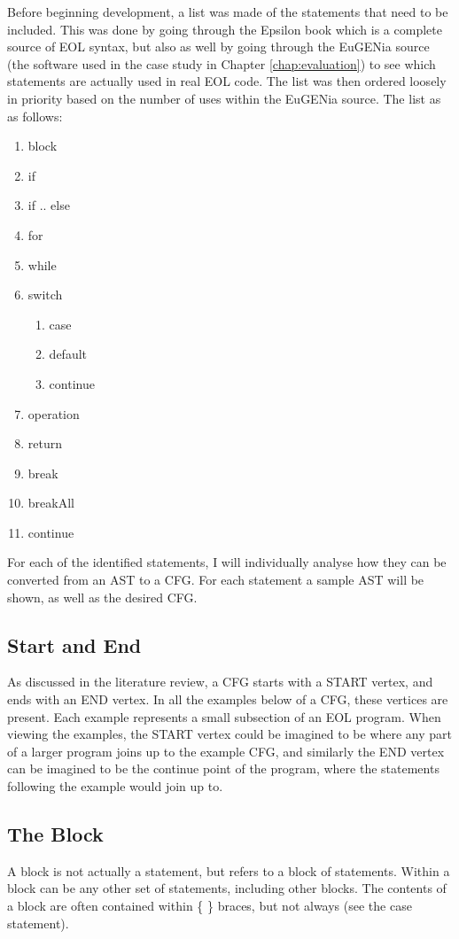 Before beginning development, a list was made of the statements that need to be included. This was done by going through the Epsilon book \citep{epsilonBook} which is a complete source of EOL syntax, but also as well by going through the EuGENia source (the software used in the case study in Chapter \ref{chap:evaluation}) to see which statements are actually used in real EOL code. The list was then ordered loosely in priority based on the number of uses within the EuGENia source. The list as as follows:

\begin{enumerate}[nolistsep]
\item block
\item if
\item if .. else
\item for
\item while
\item switch
	\begin{enumerate}
	\item case
	\item default
	\item continue
	\end{enumerate}
\item operation
\item return
\item break
\item breakAll
\item continue
\end{enumerate}

For each of the identified statements, I will individually analyse how they can be converted from an AST to a CFG. For each statement a sample AST will be shown, as well as the desired CFG.

\subsection{Start and End}
As discussed in the literature review, a CFG starts with a START vertex, and ends with an END vertex. In all the examples below of a CFG, these vertices are present. Each example represents a small subsection of an EOL program. When viewing the examples, the START vertex could be imagined to be where any part of a larger program joins up to the example CFG, and similarly the END vertex can be imagined to be the continue point of the program, where the statements following the example would join up to.

\subsection{The Block}
A block is not actually a statement, but refers to a block of statements. Within a block can be any other set of statements, including other blocks. The contents of a block are often contained within \{ \} braces, but not always (see the case statement).

